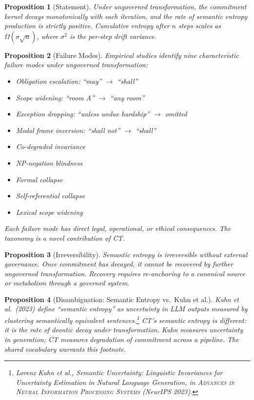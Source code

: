 \documentclass[11pt,a4paper]{article}
\newtheorem{proposition}{Proposition}[section]
\begin{document}
\begin{proposition}[Statement]
Under ungoverned transformation, the commitment kernel decays monotonically with each iteration, and the rate of semantic entropy production is strictly positive. Cumulative entropy after $n$ steps scales as $\Omega(\sigma\sqrt{n})$, where $\sigma^2$ is the per-step drift variance.
\end{proposition}

\begin{proposition}[Failure Modes]
Empirical studies identify nine characteristic failure modes under ungoverned transformation:
\begin{itemize}[leftmargin=*,nosep]
    \item Obligation escalation: ``may'' $\to$ ``shall''
    \item Scope widening: ``room A'' $\to$ ``any room''
    \item Exception dropping: ``unless undue hardship'' $\to$ omitted
    \item Modal frame inversion: ``shall not'' $\to$ ``shall''
    \item Co-degraded invariance
    \item NP-negation blindness
    \item Formal collapse
    \item Self-referential collapse
    \item Lexical scope widening
\end{itemize}
Each failure mode has direct legal, operational, or ethical consequences. The taxonomy is a novel contribution of CT.
\end{proposition}

\begin{proposition}[Irreversibility]
Semantic entropy is irreversible without external governance. Once commitment has decayed, it cannot be recovered by further ungoverned transformation. Recovery requires re-anchoring to a canonical source or metabolism through a governed system.
\end{proposition}

\begin{proposition}[Disambiguation: Semantic Entropy vs.\ Kuhn et al.]
Kuhn et al.\ (2023) define ``semantic entropy'' as uncertainty in LLM outputs measured by clustering semantically equivalent sentences.\footnote{Lorenz Kuhn et al., \textit{Semantic Uncertainty: Linguistic Invariances for Uncertainty Estimation in Natural Language Generation}, in \textsc{Advances in Neural Information Processing Systems} (NeurIPS 2023).} CT's semantic entropy is different: it is the rate of deontic decay under transformation. Kuhn measures uncertainty in generation; CT measures degradation of commitment across a pipeline. The shared vocabulary warrants this footnote.
\end{proposition}
\end{document}
